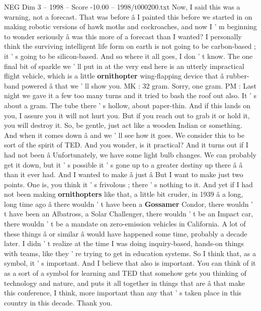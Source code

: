 \begin{textsample}{NEG Dim 3 – 1998 – Score -10.00 – 1998/t000200.txt}
Now, I said this was a warning, not a forecast.
That was before â I painted this before we started in on making robotic versions of hawk moths and cockroaches, and now I ' m beginning to wonder seriously â was this more of a forecast than I wanted?
I personally think the surviving intelligent life form on earth is not going to be carbon-based ; it ' s going to be silicon-based.
And so where it all goes, I don ' t know.
The one final bit of sparkle we ' ll put in at the very end here is an utterly impractical flight vehicle, which is a little \textbf{ornithopter} wing-flapping device that â rubber-band powered â that we ' ll show you.
MK : 32 gram.
Sorry, one gram.
PM : Last night we gave it a few too many turns and it tried to bash the roof out also.
It ' s about a gram.
The tube there ' s hollow, about paper-thin.
And if this lands on you, I assure you it will not hurt you.
But if you reach out to grab it or hold it, you will destroy it.
So, be gentle, just act like a wooden Indian or something.
And when it comes down â and we ' ll see how it goes.
We consider this to be sort of the spirit of TED.
And you wonder, is it practical?
And it turns out if I had not been â Unfortunately, we have some light bulb changes.
We can probably get it down, but it ' s possible it ' s gone up to a greater destiny up there â â than it ever had.
And I wanted to make â just â But I want to make just two points.
One is, you think it ' s frivolous ; there ' s nothing to it.
And yet if I had not been making \textbf{ornithopters} like that, a little bit cruder, in 1939 â a long, long time ago â there wouldn ' t have been a \textbf{Gossamer} Condor, there wouldn ' t have been an Albatross, a Solar Challenger, there wouldn ' t be an Impact car, there wouldn ' t be a mandate on zero-emission vehicles in California.
A lot of these things â or similar â would have happened some time, probably a decade later.
I didn ' t realize at the time I was doing inquiry-based, hands-on things with teams, like they ' re trying to get in education systems.
So I think that, as a symbol, it ' s important.
And I believe that also is important.
You can think of it as a sort of a symbol for learning and TED that somehow gets you thinking of technology and nature, and puts it all together in things that are â that make this conference, I think, more important than any that ' s taken place in this country in this decade.
Thank you.

\end{textsample}
